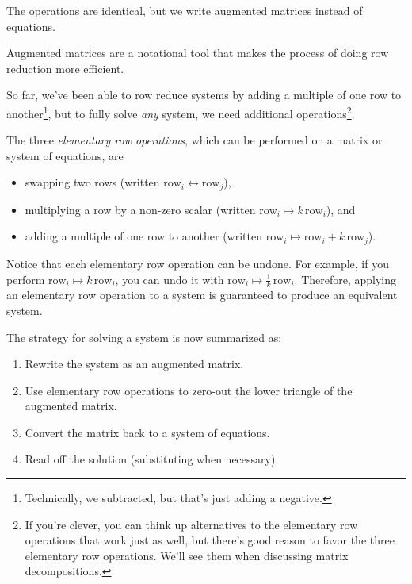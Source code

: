 	The operations are identical, but we write augmented matrices instead of equations.

	\begin{emphbox}[Takeaway]
		Augmented matrices are a notational tool that makes the process of doing row reduction more efficient.
	\end{emphbox}


	So far, we've been able to row reduce systems by adding a multiple of one row to another\footnote{ Technically, we subtracted, but
	that's just adding a negative.}, but to fully solve \emph{any} system, we need additional operations\footnote{ If you're clever,
	you can think up alternatives to the elementary row operations that work just as well, but there's good reason to favor 
	the
	three elementary row operations. We'll see them when discussing matrix decompositions.}.
	\begin{definition}
		The three \emph{elementary row operations}, which can be performed on a matrix or system of equations, are
		\smallskip
		\begin{itemize}
			\item swapping two rows (written $\text{row}_i\leftrightarrow \text{row}_j$),
			\item multiplying a row by a non-zero scalar (written $\text{row}_i\mapsto k\,\text{row}_i$), and
			\item adding a multiple of one row to another (written $\text{row}_i\mapsto \text{row}_i+ k\,\text{row}_j$).
		\end{itemize}
	\end{definition}

	Notice that each elementary row operation can be undone. For example, if you perform $\text{row}_i\mapsto k\,\text{row}_i$,
	you can undo it with $\text{row}_i\mapsto \tfrac{1}{k}\,\text{row}_i$. Therefore, applying an elementary row operation
	to a system is guaranteed to
	produce an equivalent system. 

	The strategy for solving a system is now summarized as:
	\begin{enumerate}
		\item Rewrite the system as an augmented matrix.
		\item Use elementary row operations to zero-out the lower triangle of the augmented matrix.
		\item Convert the matrix back to a system of equations.
		\item Read off the solution (substituting when necessary).
	\end{enumerate}

